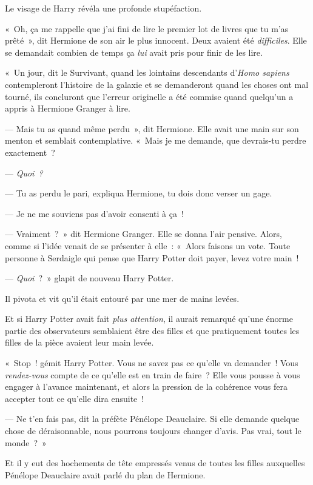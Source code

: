 Le visage de Harry révéla une profonde stupéfaction.

«~Oh, ça me rappelle que j'ai fini de lire le premier lot de livres que tu m'as prêté~», dit Hermione de son air le plus innocent.
Deux avaient été \emph{difficiles}.
Elle se demandait combien de temps ça \emph{lui} avait pris pour finir de les lire.

«~Un jour, dit le Survivant, quand les lointains descendants d'\emph{Homo sapiens} contempleront l'histoire de la galaxie et se demanderont quand les choses ont mal tourné, ils concluront que l'erreur originelle a été commise quand quelqu'un a appris à Hermione Granger à lire.

--- Mais tu as quand même perdu~», dit Hermione.
Elle avait une main sur son menton et semblait contemplative.
«~Mais je me demande, que devrais-tu perdre exactement~?

--- \emph{Quoi~?}

--- Tu as perdu le pari, expliqua Hermione, tu dois donc verser un gage.

--- Je ne me souviens pas d'avoir consenti à ça~!

--- Vraiment~?~»
dit Hermione Granger.
Elle se donna l'air pensive.
Alors, comme si l'idée venait de se présenter à elle~: «~Alors faisons un vote.
Toute personne à Serdaigle qui pense que Harry Potter doit payer, levez votre main~!

--- \emph{Quoi}~?~»
glapit de nouveau Harry Potter.

Il pivota et vit qu'il était entouré par une mer de mains levées.

Et si Harry Potter avait fait \emph{plus attention}, il aurait remarqué qu'une énorme partie des observateurs semblaient être des filles et que pratiquement toutes les filles de la pièce avaient leur main levée.

«~Stop~! gémit Harry Potter.
Vous ne savez pas ce qu'elle va demander~!
Vous \emph{rendez-vous} compte de ce qu'elle est en train de faire~?
Elle vous pousse à vous engager à l'avance maintenant, et alors la pression de la cohérence vous fera accepter tout ce qu'elle dira ensuite~!

--- Ne t'en fais pas, dit la préfète Pénélope Deauclaire.
Si elle demande quelque chose de déraisonnable, nous pourrons toujours changer d'avis.
Pas vrai, tout le monde~?~»

Et il y eut des hochements de tête empressés venus de toutes les filles auxquelles Pénélope Deauclaire avait parlé du plan de Hermione.

